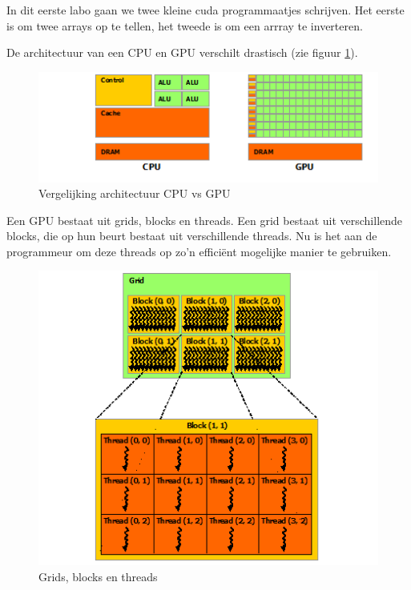 \documentclass[twoside,a4paper]{article}
\begin{document}
In dit eerste labo gaan we twee kleine cuda programmaatjes schrijven. Het eerste is om twee arrays op te tellen, het tweede is om een arrray te inverteren.
\cite{whatiscuda}

De architectuur van een CPU en GPU verschilt drastisch (zie figuur \ref{fig:cpugpu}).
\begin{figure}[H]
    \centering
    \includegraphics[scale=0.7]{gpu-devotes-more-transistors-to-data-processing.png}
    \caption{Vergelijking architectuur CPU vs GPU \cite{cudaprogrammingguide}}
    \label{fig:cpugpu}
\end{figure}

Een GPU bestaat uit grids, blocks en threads. Een grid bestaat uit verschillende blocks, die op hun beurt bestaat uit verschillende threads. Nu is het aan de programmeur om deze threads op zo'n effici\"ent mogelijke manier te gebruiken.
\cite{cudaprogrammingguide}

\begin{figure}[H]
    \centering
    \includegraphics[scale=0.6]{grid-of-thread-blocks.png}
    \caption{Grids, blocks en threads \cite{cudaprogrammingguide}}
    \label{fig:gridthreadblocks}
\end{figure}
\end{document}
